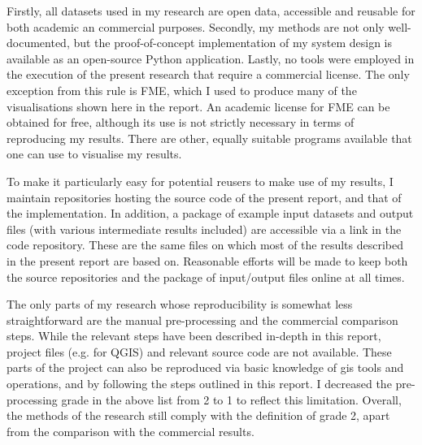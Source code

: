 Firstly, all datasets used in my research are open data, accessible and reusable for both academic an commercial purposes. Secondly, my methods are not only well-documented, but the proof-of-concept implementation of my system design is available as an open-source Python application. Lastly, no tools were employed in the execution of the present research that require a commercial license. The only exception from this rule is FME, which I used to produce many of the visualisations shown here in the report. An academic license for FME can be obtained for free, although its use is not strictly necessary in terms of reproducing my results. There are other, equally suitable programs available that one can use to visualise my results.

To make it particularly easy for potential reusers to make use of my results, I maintain repositories hosting the source code of the present report, and that of the implementation. In addition, a package of example input datasets and output files (with various intermediate results included) are accessible via a link in the code repository. These are the same files on which most of the results described in the present report are based on. Reasonable efforts will be made to keep both the source repositories and the package of input/output files online at all times.

The only parts of my research whose reproducibility is somewhat less straightforward are the manual pre-processing and the commercial comparison steps. While the relevant steps have been described in-depth in this report, project files (e.g. for QGIS) and relevant source code are not available. These parts of the project can also be reproduced via basic knowledge of \ac{gis} tools and operations, and by following the steps outlined in this report. I decreased the pre-processing grade in the above list from 2 to 1 to reflect this limitation. Overall, the methods of the research still comply with the definition of grade 2, apart from the comparison with the commercial results.